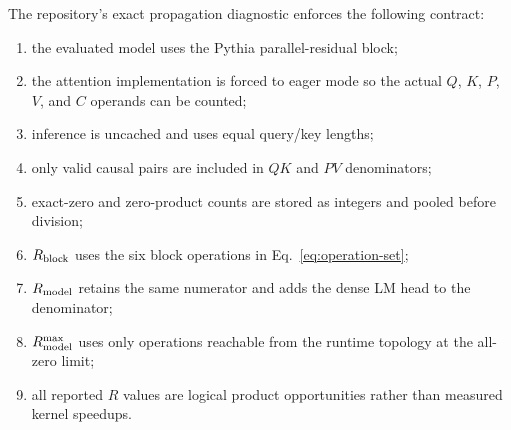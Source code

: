 The repository's exact propagation diagnostic enforces the following contract:
\begin{enumerate}
    \item the evaluated model uses the Pythia parallel-residual block;
    \item the attention implementation is forced to eager mode so the actual
          $Q$, $K$, $P$, $V$, and $C$ operands can be counted;
    \item inference is uncached and uses equal query/key lengths;
    \item only valid causal pairs are included in $QK$ and $PV$ denominators;
    \item exact-zero and zero-product counts are stored as integers and pooled
          before division;
    \item $R_{\mathrm{block}}$ uses the six block operations in
          Eq.~\eqref{eq:operation-set};
    \item $R_{\mathrm{model}}$ retains the same numerator and adds the dense LM head to
          the denominator;
    \item $R_{\mathrm{model}}^{\max}$ uses only operations reachable from the runtime
          topology at the all-zero limit;
    \item all reported $R$ values are logical product opportunities rather than
          measured kernel speedups.
\end{enumerate}
